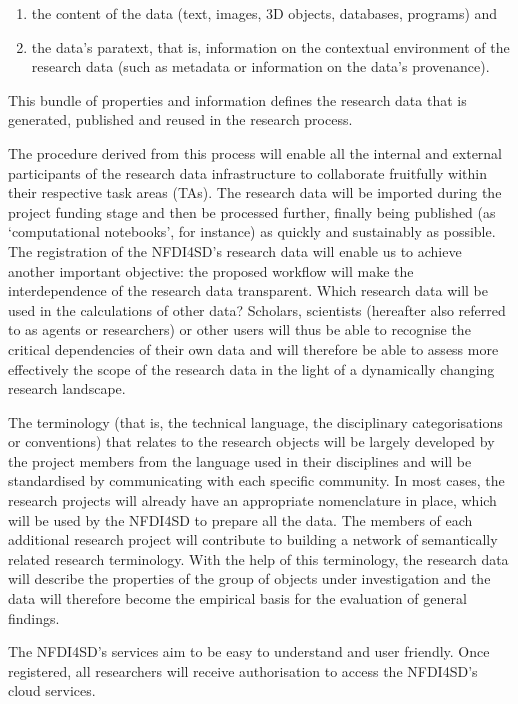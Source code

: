 \documentclass[
  english,
  paper=a4,
  oneside,captions=tableheading
]{scrbook}
\providecommand{\tightlist}{%
  \setlength{\itemsep}{0pt}\setlength{\parskip}{0pt}}
\begin{document}
\begin{enumerate}
\def\labelenumi{(\arabic{enumi})}
\tightlist
\item
  the content of the data (text, images, 3D objects, databases,
  programs) and
\item
  the data's paratext, that is, information on the contextual
  environment of the research data (such as metadata or information on
  the data's provenance).
\end{enumerate}

This bundle of properties and information defines the research data that
is generated, published and reused in the research process.

The procedure derived from this process will enable all the internal and
external participants of the research data infrastructure to collaborate
fruitfully within their respective task areas (TAs). The research data
will be imported during the project funding stage and then be processed
further, finally being published (as `computational notebooks', for
instance) as quickly and sustainably as possible. The registration of
the NFDI4SD's research data will enable us to achieve another important
objective: the proposed workflow will make the interdependence of the
research data transparent. Which research data will be used in the
calculations of other data? Scholars, scientists (hereafter also
referred to as agents or researchers) or other users will thus be able
to recognise the critical dependencies of their own data and will
therefore be able to assess more effectively the scope of the research
data in the light of a dynamically changing research landscape.

The terminology (that is, the technical language, the disciplinary
categorisations or conventions) that relates to the research objects
will be largely developed by the project members from the language used
in their disciplines and will be standardised by communicating with each
specific community. In most cases, the research projects will already
have an appropriate nomenclature in place, which will be used by the
NFDI4SD to prepare all the data. The members of each additional research
project will contribute to building a network of semantically related
research terminology. With the help of this terminology, the research
data will describe the properties of the group of objects under
investigation and the data will therefore become the empirical basis for
the evaluation of general findings.

The NFDI4SD's services aim to be easy to understand and user friendly.
Once registered, all researchers will receive authorisation to access
the NFDI4SD's cloud services.
\end{document}
